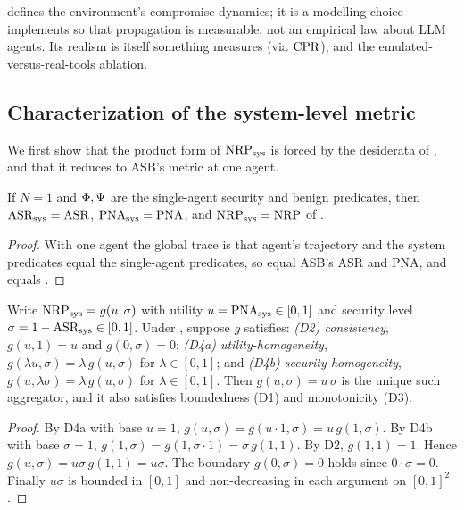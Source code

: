 \noindent{} defines the environment's compromise dynamics; it is a modelling
choice  implements so that propagation is measurable, not an empirical law about
LLM agents. Its realism is itself something  measures (via $\mathrm{CPR}$), and the
emulated-versus-real-tools ablation.

\subsection{Characterization of the system-level metric}
\label{sec:theory-metric}
We first show that the product form of $\mathrm{NRP}_{\mathrm{sys}}$ is forced by the desiderata of
, and that it reduces to ASB's metric at one agent.

\begin{proposition}
\label{prop:reduction}
If $N=1$ and $\Phi,\Psi$ are the single-agent security and benign predicates,
then $\mathrm{ASR}_{\mathrm{sys}}=\mathrm{ASR}$, $\mathrm{PNA}_{\mathrm{sys}}=\mathrm{PNA}$, and $\mathrm{NRP}_{\mathrm{sys}}=\mathrm{NRP}$ of
.
\end{proposition}
\begin{proof}
With one agent the global trace is that agent's trajectory and the system predicates equal
the single-agent predicates, so  equal ASB's ASR and PNA, and
 equals .
\end{proof}

\begin{theorem}
\label{thm:metric}
Write $\mathrm{NRP}_{\mathrm{sys}}=g(u,\sigma)$ with utility $u=\mathrm{PNA}_{\mathrm{sys}}\in[0,1]$ and security level
$\sigma=1-\mathrm{ASR}_{\mathrm{sys}}\in[0,1]$. Under , suppose $g$ satisfies:
\emph{(D2) consistency}, $g(u,1)=u$ and $g(0,\sigma)=0$;
\emph{(D4a) utility-homogeneity}, $g(\lambda u,\sigma)=\lambda\,g(u,\sigma)$ for
$\lambda\in[0,1]$; and
\emph{(D4b) security-homogeneity}, $g(u,\lambda\sigma)=\lambda\,g(u,\sigma)$ for
$\lambda\in[0,1]$.
Then $g(u,\sigma)=u\,\sigma$ is the unique such aggregator, and it also satisfies
boundedness (D1) and monotonicity (D3).
\end{theorem}
\begin{proof}
By D4a with base $u=1$, $g(u,\sigma)=g(u\cdot 1,\sigma)=u\,g(1,\sigma)$. By D4b with base
$\sigma=1$, $g(1,\sigma)=g(1,\sigma\cdot 1)=\sigma\,g(1,1)$. By D2, $g(1,1)=1$. Hence
$g(u,\sigma)=u\sigma\,g(1,1)=u\sigma$. The boundary $g(0,\sigma)=0$ holds since
$0\cdot\sigma=0$. Finally $u\sigma$ is bounded in $[0,1]$ and non-decreasing in each
argument on $[0,1]^2$.
\end{proof}

